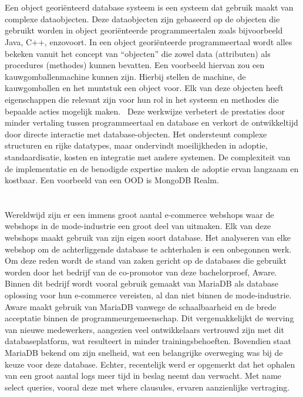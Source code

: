 \section{}%
\label{sec:Object-georiënteerde-databases}

Een object georiënteerd database systeem is een systeem dat gebruik maakt van complexe dataobjecten. Deze dataobjecten zijn gebaseerd op de objecten die gebruikt worden in object georiënteerde programmeertalen zoals bijvoorbeeld Java, C++, enzovoort. In een object georiënteerde programmeertaal wordt alles bekeken vanuit het concept van “objecten” die zowel data (attributen) als procedures (methodes) kunnen bevatten. Een voorbeeld hiervan zou een kauwgomballenmachine kunnen zijn. Hierbij stellen de machine, de kauwgomballen en het muntstuk een object voor. Elk van deze objecten heeft eigenschappen die relevant zijn voor hun rol in het systeem en methodes die bepaalde acties mogelijk maken.~\autocite{MongoDB} Deze werkwijze verbetert de prestaties door minder vertaling tussen programmeertaal en database en verkort de ontwikkeltijd door directe interactie met database-objecten. Het ondersteunt complexe structuren en rijke datatypes, maar ondervindt moeilijkheden in adoptie, standaardisatie, kosten en integratie met andere systemen. De complexiteit van de implementatie en de benodigde expertise maken de adoptie ervan langzaam en kostbaar. Een voorbeeld van een OOD is MongoDB Realm.
\newpage
\section{}%
\label{sec:De praktijk}

Wereldwijd zijn er een immens groot aantal e-commerce webshops waar de webshops in de mode-industrie een groot deel van uitmaken. Elk van deze webshops maakt gebruik van zijn eigen soort database. Het analyseren van elke webshop om de achterliggende database te achterhalen is een onbegonnen werk. Om deze reden wordt de stand van zaken gericht op de databases die gebruikt worden door het bedrijf van de co-promotor van deze bachelorproef, Aware. Binnen dit bedrijf wordt vooral gebruik gemaakt van MariaDB als database oplossing voor hun e-commerce vereisten, al dan niet binnen de mode-industrie. Aware maakt gebruik van MariaDB vanwege de schaalbaarheid en de brede acceptatie binnen de programmeurgemeenschap. Dit vergemakkelijkt de werving van nieuwe medewerkers, aangezien veel ontwikkelaars vertrouwd zijn met dit databaseplatform, wat resulteert in minder trainingsbehoeften. Bovendien staat MariaDB bekend om zijn snelheid, wat een belangrijke overweging was bij de keuze voor deze database. Echter, recentelijk werd er opgemerkt dat het ophalen van een groot aantal logs meer tijd in beslag neemt dan verwacht. Met name select queries, vooral deze met where clausules, ervaren aanzienlijke vertraging.